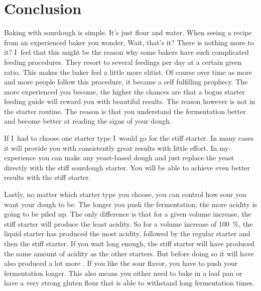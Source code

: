 \section{Conclusion}%
\label{sec:starter-type-conclusion}
Baking with sourdough is simple. It's just flour and water. When seeing a recipe
from an experienced baker you wonder, Wait, that's it? There is nothing more
to it? I~feel that this might be the reason why some bakers have such complicated
feeding procedures. They resort to several feedings per day at a certain given ratio.
This makes the baker feel a little more elitist. Of course over time as
more and more people follow this procedure, it became a self fulfilling prophecy.
The more experienced you become, the higher the chances are that a bogus starter
feeding guide will reward you with beautiful results. The reason however is
not in the starter routine. The reason is that you understand the fermentation better
and become better at reading the signs of your dough.

If I~had to choose one starter type I~would go for the stiff starter. In many cases
it will provide you with consistently great results with little effort.
In my experience you can make any yeast-based dough and just replace
the yeast directly with the stiff sourdough starter. You will be able
to achieve even better results with the stiff starter.

Lastly, no matter which starter type you choose, you can control how sour
you want your dough to be. The longer you push the fermentation, the more
acidity is going to be piled up. The only difference is that for a given
volume increase, the stiff starter will produce the least acidity. So for a
volume increase of \qty{100}{\percent}, the liquid starter has produced the most acidity,
followed by the regular starter and then the stiff starter. If you wait long
enough, the stiff starter will have produced the same amount of acidity as the
other starters. But before doing so it will have also produced a lot more . If
you like the sour flavor, you have to push your fermentation longer. This also
means you either need to bake in a loaf pan or have a very strong gluten flour
that is able to withstand long fermentation times.
